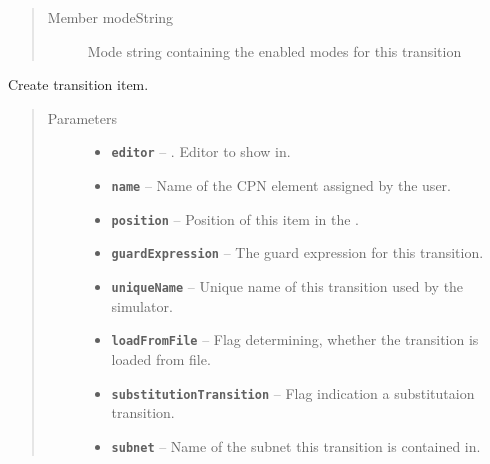 \documentclass[a4paper,10pt,english]{sphinxmanual}
\begin{document}
\begin{fulllineitems}
\begin{quote}
\begin{description}
\item[{Member modeString}] \leavevmode
Mode string containing the enabled modes for this transition

\end{description}\end{quote}

\begin{fulllineitems}
\label{model_link:model.TransitionItem.TransitionItem.__init__}
Create transition item.
\begin{quote}\begin{description}
\item[{Parameters}] \leavevmode\begin{itemize}
\item {} 
\textbf{\texttt{editor}} -- . Editor to show in.

\item {} 
\textbf{\texttt{name}} -- Name of the CPN element assigned by the user.

\item {} 
\textbf{\texttt{position}} -- Position of this item in the .

\item {} 
\textbf{\texttt{guardExpression}} -- The guard expression for this transition.

\item {} 
\textbf{\texttt{uniqueName}} -- Unique name of this transition used by the simulator.

\item {} 
\textbf{\texttt{loadFromFile}} -- Flag determining, whether the transition is loaded from file.

\item {} 
\textbf{\texttt{substitutionTransition}} -- Flag indication a substitutaion transition.

\item {} 
\textbf{\texttt{subnet}} -- Name of the subnet this transition is contained in.

\end{itemize}

\end{description}\end{quote}


\end{fulllineitems}
\end{fulllineitems}
\end{document}

